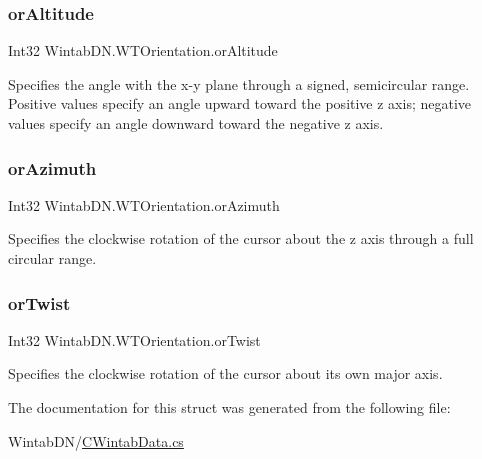 \subsubsection{\texorpdfstring{or\+Altitude}{orAltitude}}
{\footnotesize\ttfamily Int32 Wintab\+D\+N.\+W\+T\+Orientation.\+or\+Altitude}



Specifies the angle with the x-\/y plane through a signed, semicircular range. ~\newline
Positive values specify an angle upward toward the positive z axis; negative values specify an angle downward toward the negative z axis. 

\mbox{\label{struct_wintab_d_n_1_1_w_t_orientation_a15a77946f970b8661984fc999c52688c}} 
\subsubsection{\texorpdfstring{or\+Azimuth}{orAzimuth}}
{\footnotesize\ttfamily Int32 Wintab\+D\+N.\+W\+T\+Orientation.\+or\+Azimuth}



Specifies the clockwise rotation of the cursor about the z axis through a full circular range. 

\mbox{\label{struct_wintab_d_n_1_1_w_t_orientation_a14362dcbf64d7fb048c523a4bbbd9705}} 
\subsubsection{\texorpdfstring{or\+Twist}{orTwist}}
{\footnotesize\ttfamily Int32 Wintab\+D\+N.\+W\+T\+Orientation.\+or\+Twist}



Specifies the clockwise rotation of the cursor about its own major axis. 



The documentation for this struct was generated from the following file\+:\begin{DoxyCompactItemize}
\item 
Wintab\+D\+N/\mbox{\hyperlink{_c_wintab_data_8cs}{C\+Wintab\+Data.\+cs}}\end{DoxyCompactItemize}
